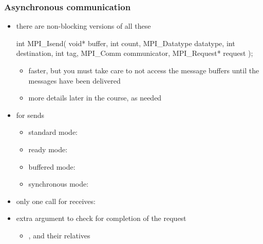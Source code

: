 \begin{frame}[fragile]
%
  \frametitle{Asynchronous communication}
%
  \begin{itemize}
%
  \item there are non-blocking versions of all these
    \begin{C}
int MPI_Isend(
        void* buffer, int count, MPI_Datatype datatype,
        int destination, int tag, 
        MPI_Comm communicator, MPI_Request* request
        );
    \end{C}
    \begin{itemize}
    \item faster, but you must take care to not access the message buffers until the messages
      have been delivered
    \item more details later in the course, as needed
    \end{itemize}
%
  \item for sends
    \begin{itemize}
    \item standard mode: 
    \item ready mode: 
    \item buffered mode: 
    \item synchronous mode: 
    \end{itemize}
%
  \item only one call for receives: 
%
  \item extra  argument to check for completion of the request
    \begin{itemize}
    \item {},  and their relatives
    \end{itemize}
%
  \end{itemize}
%
\end{frame}

